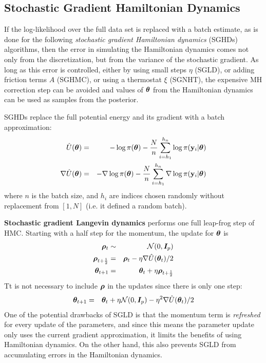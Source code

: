 \documentclass[]{article}
\begin{document}
\subsection{Stochastic Gradient Hamiltonian Dynamics}
If the log-likelihood over the full data set is replaced with a batch estimate, as is done for the following {\em stochastic gradient Hamiltonian dynamics} (SGHDs) algorithms, then the error in simulating the Hamiltonian dynamics comes not only from the discretization, but from the variance of the stochastic gradient.  As long as this error is controlled, either by using small steps $\eta$ (SGLD), or adding friction terms $A$ (SGHMC), or using a thermostat $\xi$ (SGNHT), the expensive MH correction step can be avoided and values of ${\bm \theta}$ from the Hamiltonian dynamics can be used as samples from the posterior.

SGHDs replace the full potential energy and its gradient with a batch approximation:
\begin{eqnarray}
  \hat{U}({\bm \theta})       & = & - \log \pi({\bm \theta}) - \frac{N}{n} \sum_{i=h_1}^{h_n} \log \pi({\bf y}_i | {\bm \theta} ) \\
  \nabla\hat{U}({\bm \theta}) & = & - \nabla \log \pi({\bm \theta}) - \frac{N}{n} \sum_{i=h_1}^{h_n} \nabla \log \pi({\bf y}_i | {\bm \theta} ) 
\end{eqnarray} 
where $n$ is the batch size, and $h_i$ are indices chosen randomly without replacement from $[1,N]$ (i.e. it defined a random batch).  
 
{\bf Stochastic gradient Langevin dynamics} \cite{welling2011bayesian} performs one full leap-frog step of HMC.   Starting with a half step for the momentum, the update for ${\bm \theta}$ is 
\begin{eqnarray}
  {\bm \rho}_t & \sim & \mathcal{N}(0,{\bm I}_p) \\
  {\bm \rho}_{t+\frac{1}{2}} & = & {\bm \rho}_t - \eta \nabla \hat{U}({\bm \theta}_t) /2 \\
  {\bm \theta}_{t+1} & = & {\bm \theta}_t + \eta {\bm \rho}_{t+\frac{1}{2}}
\end{eqnarray}
Tt is not necessary to include ${\bm \rho}$ in the updates since there is only one step:
\begin{eqnarray}
  {\bm \theta}_{t+1} & = & {\bm \theta}_t + \eta \mathcal{N}(0,{\bm I}_p) - \eta^2 \nabla \hat{U}({\bm \theta}_t) /2 
\end{eqnarray}
One of the potential drawbacks of SGLD is that the momentum term is {\em refreshed} for every update of the parameters, and since this means the parameter update only uses the current gradient approximation, it limits the benefits of using Hamiltonian dynamics.  On the other hand, this also prevents SGLD from accumulating errors in the Hamiltonian dynamics.
\end{document}
